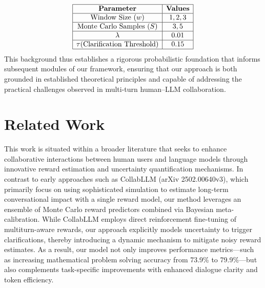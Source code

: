 \documentclass{article}
\begin{document}
\[
\begin{array}{|c|c|}
\hline
\textbf{Parameter} & \textbf{Values} \\
\hline
\text{Window Size } (w) & 1, 2, 3 \\
\hline
\text{Monte Carlo Samples } (S) & 3, 5 \\
\hline
\lambda & 0.01 \\
\hline
\tau (\text{Clarification Threshold}) & 0.15 \\
\hline
\end{array}
\]
\label{tab:ensemble_settings}
This background thus establishes a rigorous probabilistic foundation that informs subsequent modules of our framework, ensuring that our approach is both grounded in established theoretical principles and capable of addressing the practical challenges observed in multi-turn human–LLM collaboration.

\section{Related Work}
This work is situated within a broader literature that seeks to enhance collaborative interactions between human users and language models through innovative reward estimation and uncertainty quantification mechanisms. In contrast to early approaches such as CollabLLM (arXiv 2502.00640v3), which primarily focus on using sophisticated simulation to estimate long-term conversational impact with a single reward model, our method leverages an ensemble of Monte Carlo reward predictors combined via Bayesian meta-calibration. While CollabLLM employs direct reinforcement fine-tuning of multiturn-aware rewards, our approach explicitly models uncertainty to trigger clarifications, thereby introducing a dynamic mechanism to mitigate noisy reward estimates. As a result, our model not only improves performance metrics—such as increasing mathematical problem solving accuracy from 73.9\% to 79.9\%—but also complements task-specific improvements with enhanced dialogue clarity and token efficiency.
\end{document}
